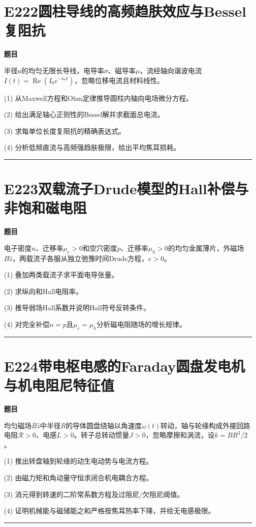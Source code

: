 \documentclass[UTF8,a4paper,11pt,oneside,openany]{ctexbook}
\begin{document}
\section*{E222\quad 圆柱导线的高频趋肤效应与Bessel复阻抗}
\textbf{题目}\par
半径$a$的均匀无限长导线，电导率$\sigma$、磁导率$\mu$，流经轴向谐波电流$I(t)=\operatorname{Re}(I_0e^{-i\omega t})$，忽略位移电流且材料线性。
\par\smallskip\noindent (1) 从Maxwell方程和Ohm定律推导圆柱内轴向电场微分方程。
\par\smallskip\noindent (2) 给出满足轴心正则性的Bessel解并求截面总电流。
\par\smallskip\noindent (3) 求每单位长度复阻抗的精确表达式。
\par\smallskip\noindent (4) 分析低频直流与高频强趋肤极限，给出平均焦耳损耗。
\par\medskip\hrule\medskip
\section*{E223\quad 双载流子Drude模型的Hall补偿与非饱和磁电阻}
\textbf{题目}\par
电子密度$n$、迁移率$\mu_e>0$和空穴密度$p$、迁移率$\mu_h>0$的均匀金属薄片，外磁场$B\hat z$，两载流子各服从独立弛豫时间Drude方程，$e>0$。
\par\smallskip\noindent (1) 叠加两类载流子求平面电导张量。
\par\smallskip\noindent (2) 求纵向和Hall电阻率。
\par\smallskip\noindent (3) 推导弱场Hall系数并说明Hall符号反转条件。
\par\smallskip\noindent (4) 对完全补偿$n=p$且$\mu_e=\mu_h$分析磁电阻随场的增长规律。
\par\medskip\hrule\medskip
\section*{E224\quad 带电枢电感的Faraday圆盘发电机与机电阻尼特征值}
\textbf{题目}\par
均匀磁场$B\hat z$中半径$R$的导体圆盘绕轴以角速度$\omega(t)$转动，轴与轮缘构成外接回路电阻$\mathcal R>0$、电感$L>0$。转子总转动惯量$J>0$，忽略摩擦和涡流，设$k=BR^2/2$。
\par\smallskip\noindent (1) 推出转盘轴到轮缘的动生电动势与电流方程。
\par\smallskip\noindent (2) 由磁力矩和角动量守恒求闭合机电耦合方程。
\par\smallskip\noindent (3) 消元得到转速的二阶常系数方程及过阻尼/欠阻尼阈值。
\par\smallskip\noindent (4) 证明机械能与磁储能之和严格按焦耳热率下降，并给无电感极限。
\par\medskip\hrule\medskip
\end{document}
